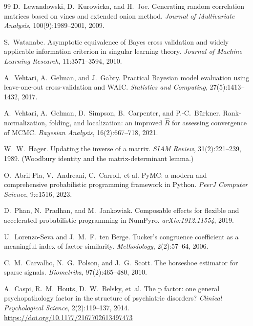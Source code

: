 \begin{thebibliography}{99}
 D.~Lewandowski, D.~Kurowicka, and H.~Joe.
\newblock Generating random correlation matrices based on vines and extended onion method.
\emph{Journal of Multivariate Analysis}, 100(9):1989--2001, 2009.

 S.~Watanabe.
\newblock Asymptotic equivalence of Bayes cross validation and widely applicable information criterion in
singular learning theory. \emph{Journal of Machine Learning Research}, 11:3571--3594, 2010.

 A.~Vehtari, A.~Gelman, and J.~Gabry.
\newblock Practical Bayesian model evaluation using leave-one-out cross-validation and WAIC.
\emph{Statistics and Computing}, 27(5):1413--1432, 2017.

 A.~Vehtari, A.~Gelman, D.~Simpson, B.~Carpenter, and P.-C.~B\"urkner.
\newblock Rank-normalization, folding, and localization: an improved $\widehat{R}$ for assessing convergence
of MCMC. \emph{Bayesian Analysis}, 16(2):667--718, 2021.

 W.~W.~Hager.
\newblock Updating the inverse of a matrix. \emph{SIAM Review}, 31(2):221--239, 1989.
(Woodbury identity and the matrix-determinant lemma.)

 O.~Abril-Pla, V.~Andreani, C.~Carroll, et al.
\newblock PyMC: a modern and comprehensive probabilistic programming framework in Python.
\emph{PeerJ Computer Science}, 9:e1516, 2023.

 D.~Phan, N.~Pradhan, and M.~Jankowiak.
\newblock Composable effects for flexible and accelerated probabilistic programming in NumPyro.
\emph{arXiv:1912.11554}, 2019.

 U.~Lorenzo-Seva and J.~M.~F.~ten Berge.
\newblock Tucker's congruence coefficient as a meaningful index of factor similarity.
\emph{Methodology}, 2(2):57--64, 2006.

 C.~M.~Carvalho, N.~G.~Polson, and J.~G.~Scott.
\newblock The horseshoe estimator for sparse signals. \emph{Biometrika}, 97(2):465--480, 2010.


 A.~Caspi, R.~M.~Houts, D.~W.~Belsky, et~al.
\newblock The p factor: one general psychopathology factor in the structure of psychiatric disorders?
\emph{Clinical Psychological Science}, 2(2):119--137, 2014. \newblock \url{https://doi.org/10.1177/2167702613497473}


\end{thebibliography}
